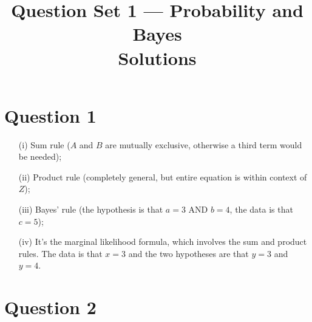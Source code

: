 \documentclass[a4paper, 12pt]{article}
\title{Question Set 1 --- Probability and Bayes\\Solutions}
\author{}
\date{}
\begin{document}
\maketitle


\setlength{\parindent}{0pt}
\setlength{\parskip}{8pt}

\section*{Question 1}

\begin{enumerate}
 \item[(i)] Sum rule ($A$ and $B$ are mutually exclusive, otherwise a third term would be needed);
 \item[(ii)] Product rule (completely general, but entire equation is within context of $Z$);
 \item[(iii)] Bayes' rule (the hypothesis is that $a=3$ AND $b=4$, the data is that $c=5$);
 \item[(iv)] It's the marginal likelihood formula, which involves the sum and product rules.
                The data is that $x=3$ and the two hypotheses are that $y=3$ and $y=4$.
\end{enumerate}

\section*{Question 2}
\end{document}
